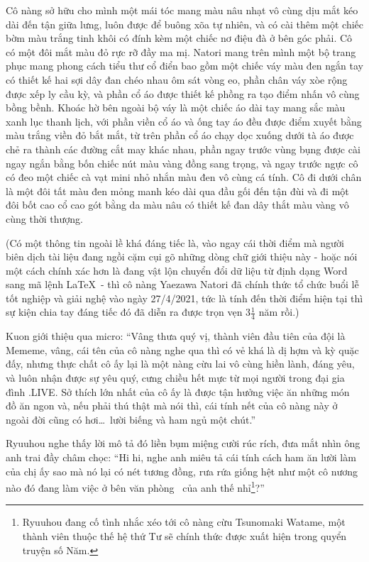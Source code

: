 \documentclass[../main.tex]{subfiles}
\begin{document}
Cô nàng sở hữu cho mình một mái tóc mang màu nâu nhạt vô cùng dịu mắt kéo dài đến tận giữa lưng, luôn được để buông xõa tự nhiên, và có cài thêm một chiếc bờm màu trắng tinh khôi có đính kèm một chiếc nơ điệu đà ở bên góc phải. Cô có một đôi mắt màu đỏ rực rỡ đầy ma mị. Natori mang trên mình một bộ trang phục mang phong cách tiểu thư cổ điển bao gồm một chiếc váy màu đen ngắn tay có thiết kế hai sợi dây đan chéo nhau ôm sát vòng eo, phần chân váy xòe rộng được xếp ly cầu kỳ, và phần cổ áo được thiết kế phồng ra tạo điểm nhấn vô cùng bồng bềnh. Khoác hờ bên ngoài bộ váy là một chiếc áo dài tay mang sắc màu xanh lục thanh lịch, với phần viền cổ áo và ống tay áo đều được điểm xuyết bằng màu trắng viền đỏ bắt mắt, từ trên phần cổ áo chạy dọc xuống dưới tà áo được chẻ ra thành các đường cắt may khác nhau, phần ngay trước vùng bụng được cài ngay ngắn bằng bốn chiếc nút màu vàng đồng sang trọng, và ngay trước ngực cô có đeo một chiếc cà vạt mini nhỏ nhắn màu đen vô cùng cá tính. Cô đi dưới chân là một đôi tất màu đen mỏng manh kéo dài qua đầu gối đến tận đùi và đi một đôi bốt cao cổ cao gót bằng da màu nâu có thiết kế đan dây thắt màu vàng vô cùng thời thượng.

(Có một thông tin ngoài lề khá đáng tiếc là, vào ngay cái thời điểm mà người biên dịch tài liệu đang ngồi cặm cụi gõ những dòng chữ giới thiệu này - hoặc nói một cách chính xác hơn là đang vật lộn chuyển đổi dữ liệu từ định dạng Word sang mã lệnh \LaTeX\ - thì cô nàng Yaezawa Natori đã chính thức tổ chức buổi lễ tốt nghiệp và giải nghệ vào ngày 27/4/2021, tức là tính đến thời điểm hiện tại thì sự kiện chia tay đáng tiếc đó đã diễn ra được trọn vẹn 3\(\frac{1}{4}\) năm rồi.)

\chrint


Kuon giới thiệu qua micro: ``Vâng thưa quý vị, thành viên đầu tiên của đội là Mememe, vâng, cái tên của cô nàng nghe qua thì có vẻ khá là dị hợm và kỳ quặc đấy, nhưng thực chất cô ấy lại là một nàng cừu lai vô cùng hiền lành, đáng yêu, và luôn nhận được sự yêu quý, cưng chiều hết mực từ mọi người trong đại gia đình .LIVE. Sở thích lớn nhất của cô ấy là được tận hưởng việc ăn những món đồ ăn ngon và, nếu phải thú thật mà nói thì, cái tính nết của cô nàng này ở ngoài đời cũng có hơi\dots\ lười biếng và ham ngủ một chút.''

Ryuuhou nghe thấy lời mô tả đó liền bụm miệng cười rúc rích, đưa mắt nhìn ông anh trai đầy châm chọc: ``Hi hi, nghe anh miêu tả cái tính cách ham ăn lười làm của chị ấy sao mà nó lại có nét tương đồng, rưa rứa giống hệt như một cô nương nào đó đang làm việc ở bên văn phòng \hll\ của anh thế nhỉ\footnote{Ryuuhou đang cố tình nhắc xéo tới cô nàng cừu Tsunomaki Watame, một thành viên thuộc thế hệ thứ Tư sẽ chính thức được xuất hiện trong quyển truyện số Năm.}?''
\end{document}
